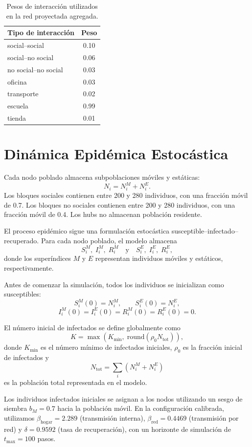 \documentclass[12pt,a4paper,twocolumn]{article}
\begin{document}
\begin{table}[H]
\centering
\small
\caption{Pesos de interacción utilizados en la red proyectada agregada.}
\label{tab:weights}
\begin{tabular}{lc}
\toprule
Tipo de interacción & Peso \\
\midrule
social--social & 0.10 \\
social--no social & 0.06 \\
no social--no social & 0.03 \\
oficina & 0.03 \\
transporte & 0.02 \\
escuela & 0.99 \\
tienda & 0.01 \\
\bottomrule
\end{tabular}
\end{table}

\section*{Dinámica Epidémica Estocástica}

Cada nodo poblado almacena subpoblaciones móviles y estáticas:
\[
N_i=N_i^M+N_i^E.
\]
Los bloques sociales contienen entre 200 y 280 individuos, con una fracción móvil de 0.7. Los bloques no sociales contienen entre 200 y 280 individuos, con una fracción móvil de 0.4. Los hubs no almacenan población residente.

El proceso epidémico sigue una formulación estocástica susceptible--infectado--recuperado. Para cada nodo poblado, el modelo almacena
\[
S_i^M,\;I_i^M,\;R_i^M
\quad \text{y} \quad
S_i^E,\;I_i^E,\;R_i^E,
\]
donde los superíndices \(M\) y \(E\) representan individuos móviles y estáticos, respectivamente.

Antes de comenzar la simulación, todos los individuos se inicializan como susceptibles:
\[
S_i^M(0)=N_i^M,\qquad S_i^E(0)=N_i^E,
\]
\[
I_i^M(0)=I_i^E(0)=R_i^M(0)=R_i^E(0)=0.
\]

El número inicial de infectados se define globalmente como
\[
K=\max\left(K_{\min},\;\mathrm{round}(\rho_0 N_{\mathrm{tot}})\right),
\]
donde \(K_{\min}\) es el número mínimo de infectados iniciales, \(\rho_0\) es la fracción inicial de infectados y
\[
N_{\mathrm{tot}}=\sum_i \left(N_i^M+N_i^E\right)
\]
es la población total representada en el modelo.

Los individuos infectados iniciales se asignan a los nodos utilizando un sesgo de siembra $b_M=0.7$ hacia la población móvil. En la configuración calibrada, utilizamos $\beta_{\mathrm{hogar}}=2.289$ (transmisión interna), $\beta_{\mathrm{red}}=0.4469$ (transmisión por red) y $\delta=0.9592$ (tasa de recuperación), con un horizonte de simulación de $t_{\max}=100$ pasos.
\end{document}
